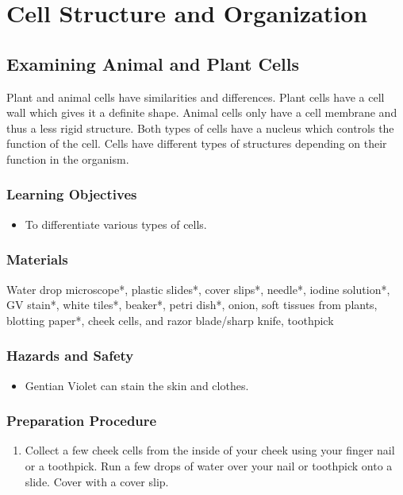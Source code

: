 \section{Cell Structure and Organization}
\subsection{Examining Animal and Plant Cells}
Plant and animal cells have similarities and differences. Plant cells have a cell wall which gives it a definite shape. Animal cells only have a cell membrane and thus a less rigid structure. Both types of cells have a nucleus which controls the function of the cell. Cells have different types of structures depending on their function in the organism.

\subsubsection*{Learning Objectives}
\begin{itemize}
\item{To differentiate various types of cells.}
\end{itemize}

\subsubsection*{Materials}
Water drop microscope*, plastic slides*, cover slips*, needle*, iodine solution*, GV stain*, white tiles*, beaker*, petri dish*, onion, soft tissues from plants, blotting paper*, cheek cells, and razor blade/sharp knife, toothpick

\subsubsection*{Hazards and Safety}
\begin{itemize}
\item{Gentian Violet can stain the skin and clothes.}
\end{itemize}

\subsubsection*{Preparation Procedure}
\begin{enumerate}
\item{Collect a few cheek cells from the inside of your cheek using your finger nail or a toothpick. Run a few drops of water over your nail or toothpick onto a slide. Cover with a cover slip.}
\end{enumerate}

